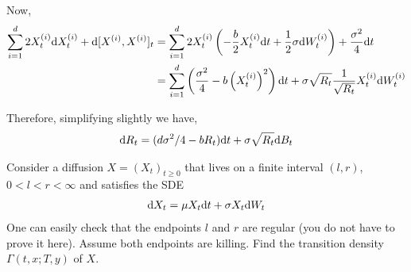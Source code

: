 \documentclass[10pt]{article}
\begin{document}
\begin{solution}[Solution]
Now, 
\begin{align*}
    \sum_{i=1}^{d} 2X_t^{(i)} \mathrm{d} X_t^{(i)} + \mathrm{d}[X^{(i)},X^{(i)}]_t 
    &= \sum_{i=1}^{d} 2X_t^{(i)} \left( -\dfrac{b}{2} X_t^{(i)}\mathrm{d} t + \dfrac{1}{2} \sigma \mathrm{d} W_t^{(i)} \right) + \dfrac{\sigma^2}{4}\mathrm{d} t
    \\&= \sum_{i=1}^{d} \left( \dfrac{\sigma^2}{4} - b \left(X_t^{(i)}\right)^2\right)\mathrm{d} t + \sigma \sqrt{R_t} \dfrac{1}{\sqrt{R_t}}X_t^{(i)} \mathrm{d} W_t^{(i)} 
\end{align*}

Therefore, simplifying slightly we have,
\begin{align*}
    \mathrm{d} R_t = (d\sigma^2/4-b R_t) \mathrm{d} t + \sigma \sqrt{R_t} \mathrm{d} B_t
\end{align*}
\end{solution}

\begin{problem}[Exercise 9.4]
\end{problem}

\begin{solution}[Solution]
\end{solution}


\begin{problem}[Exercise 9.5]
    Consider a diffusion \( X = (X_t)_{t\geq 0} \) that lives on a finite interval \( (l,r) \), \( 0 < l < r < \infty \) and satisfies the SDE
    \begin{align*}
        \mathrm{d} X_t = \mu X_t\mathrm{d} t + \sigma X_t \mathrm{d} W_t
    \end{align*}
    One can easily check that the endpoints \( l \) and \( r \) are regular (you do not have to prove it here). Assume both endpoints are killing. Find the transition density \( \Gamma(t,x ;T,y) \) of \( X \).
\end{problem}
\end{document}
